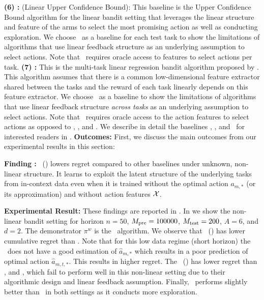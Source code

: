 \documentclass[10pt]{article}
\theoremstyle{plain}
\theoremstyle{definition}
\theoremstyle{remark}
\newcounter{findingcounter}
\newcommand{\customfinding}[1][\normalfont]{\stepcounter{findingcounter}\textbf{Finding \thefindingcounter:}#1 }
\begin{document}
\textbf{(6) \linucb:} (Linear Upper Confidence Bound): This baseline is the Upper Confidence Bound algorithm for the linear bandit setting that leverages the linear structure and feature of the arms to select the most promising action as well as conducting exploration. We choose \linucb\ as a baseline for each test task to show the limitations of algorithms that use linear feedback structure as an underlying assumption to select actions. Note that \linucb\ requires oracle access to features to select actions per task.
\textbf{(7) \mlin:} This is the multi-task linear regression bandit algorithm proposed by \citet{yang2021impact}. This algorithm assumes that there is a common low-dimensional feature extractor shared between the tasks and the reward of each task linearly depends on this feature extractor. We choose \mlin\ as a baseline to show the limitations of algorithms that use linear feedback structure \textit{across tasks} as an underlying assumption to select actions. Note that \mlin\ requires oracle access to the action features to select actions as opposed to \dpt, \ad, and \pred.
We describe in detail the baselines \ts, \linucb, and \mlin\ for interested readers in .
\textbf{Outcomes:} First, we discuss the main outcomes from our experimental results in this section:
\begin{tcolorbox}
\customfinding \pred\ (\gt)  lowers regret compared to other baselines under unknown, non-linear structure. It learns to exploit the latent structure of the underlying tasks from in-context data even when it is trained without the optimal action $a_{m,*}$ (or its approximation) and without action features $\mathcal{X}$.
\end{tcolorbox}
\textbf{Experimental Result:} These findings are reported in .
In  we show the non-linear bandit setting for horizon $n=50$, $M_{\text{pre}} = 100000$, $M_{\text{test}} = 200$, $A=6$, and $d=2$. The demonstrator $\pi^w$ is the \ts\ algorithm. We observe that \pred\ (\gt) has lower cumulative regret than \dptg.
Note that for this low data regime (short horizon) the \dptg\ does not have a good estimation of $\widehat{a}_{m,*}$ which results in a poor prediction of optimal action $\widehat{a}_{m,t,*}$. This results in higher regret.
The \pred\ (\gt) has lower regret than \linucb, and \mlin, which fail to perform well in this non-linear setting due to their algorithmic design and linear feedback assumption. Finally, \predt\ performs slightly better than \pred\ in both settings as it conducts more exploration.
\end{document}
